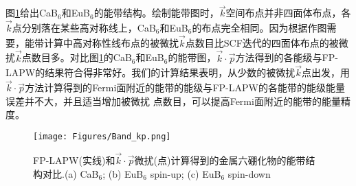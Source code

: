 图\ref{fig:Band_Hexaborides-kp}给出CaB$_6$和EuB$_6$的能带结构。绘制能带图时，$\vec k$空间布点并非四面体布点，各$\vec k$点分别落在某些高对称线上，CaB$_6$和EuB$_6$的布点完全相同。因为根据作图需要，能带计算中高对称性线布点的被微扰$\vec k$点数目比\textrm{SCF}迭代的四面体布点的被微扰$\vec k$点数目多。对比图\ref{fig:Band_Hexaborides-kp}的CaB$_6$和EuB$_6$的能带图，$\vec k\cdot\vec p$方法得到的各能级与\textrm{FP-LAPW}的结果符合得非常好。我们的计算结果表明，从少数的被微扰$\vec k$点出发，用$\vec k\cdot\vec p$方法计算得到的\textrm{Fermi}面附近的能带的能级与\textrm{FP-LAPW}的各能带的能级能量误差并不大，并且适当增加被微扰 点数目，可以提高\textrm{Fermi}面附近的能带的能量精度。
\begin{figure}[ht!]
\centering
\texttt{[image: Figures/Band\_kp.png]}
\caption{\small \textrm{FP-LAPW}(实线)和$\vec k\cdot\vec p$微扰(点)计算得到的金属六硼化物的能带结构对比.(a) CaB$_6$; (b) EuB$_6$ spin-up; (c) EuB$_6$ spin-down}%
\label{fig:Band_Hexaborides-kp}
\end{figure}
